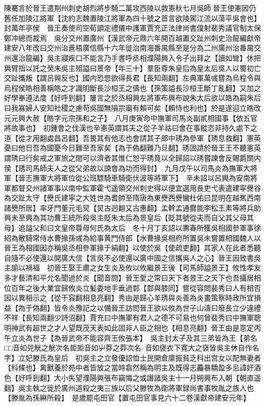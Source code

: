 陳騫言於晉王遣荆州刺史胡烈將步騎二萬攻西陵以救憲秋七月吳師晉王使憲因仍舊任加陵江將軍【沈約志魏置陵江將軍為四十號之首言欲陵駕江流以蕩平吳會也】封萬年亭侯　晉王奏使司空荀顗定禮儀中護軍賈充正法律尚書僕射裴秀議官制太保鄭冲總而裁焉　吳分交州置廣州【漢武帝元鼎六年開百越置交趾州刺史治龍編獻帝建安八年改曰交州治蒼梧廣信縣十六年徙治南海番禺縣至是分為二州廣州治番禺交州還治龍編】吳主寢疾口不能言乃手書呼丞相濮陽興入令子出拜之【讀如彎】休把興臂指以託之癸未吳主殂謚曰景帝【年三十】羣臣尊朱皇后為皇太后吳人以蜀初亡交趾攜叛【謂呂興反也】國内恐愳欲得長君【長知兩翻】左典軍萬彧嘗為烏程令與烏程侯皓相善稱皓之才識明斷長沙桓王之儔也【孫策謚長沙桓王斷丁亂翻】又加之好學奉遵法度【好呼到翻】屢言之於丞相興左將軍布興布說朱太后欲以皓為嗣朱后曰我寡婦人安知社稷之慮苟吳國無隕宗廟有賴可矣【賴恃也利也】於是遂迎立皓改元元興大赦【皓字元宗孫和之子】　八月庚寅命中撫軍司馬炎副貳相國事【依五官將故事也】　初鍾會之伐漢也辛憲英謂其夫之從子羊祜曰會在事縱恣非持久處下之道【從才用翻處昌呂翻】吾畏其有他志也會請其子郎中琇為參軍【琇息救翻】憲英憂曰他日吾為國憂今日難至吾家矣【為于偽翻難乃旦翻】琇固請於晉王王不聽憲英謂琇曰行矣戒之軍旅之間可以濟者其惟仁恕乎琇竟以全歸詔以琇嘗諫會反賜爵關内侯【琇司馬師夫人之從父弟故以諫會為功而得封】　九月戊午以司馬炎為撫軍大將軍【晉志撫軍大將軍位從公班驃騎車騎衛伏波等將軍下】　辛未詔以呂興為安南將軍都督交州諸軍事以南中監軍霍弋遥領交州刺史得以便宜選用長吏弋表遣建寜㸑谷為交趾太守【㸑氏建寜之大姓世為耆帥至隋唐為東㸑西㸑蠻杜佑曰昆明在越嶲西南諸㸑所居】率牙門董元毛炅【炅古迥翻又古惠翻】孟幹孟通爨能李松王素等將兵助興未至興為其功曹王統所殺吳主貶朱太后為景皇后【貶其號從夫而自父其父母其母】追謚父和曰文皇帝尊母何氏為太后　冬十月丁亥詔以夀春所獲吳相國參軍事徐紹為散騎常侍水曹掾孫彧為給事黄門侍郎【水曹掾吳相府所置吳未嘗置相國魏人以晉王為相國因亦稱吳丞相參軍掾于絹翻】以使於吳【使疏吏翻】其家人在此者悉聽自隨不必使還以開廣大信【言吳不必使還以廣中國之信攜吳人之心】晉王因致書吳主諭以禍福　初晉王娶王肅之女生炎及攸以攸繼景王後【司馬師謚景王】攸性孝友多才藝清和平允名聞過於炎【聞音問】晉王愛之常曰天下者景王之天下也吾攝居相位百年之後大業宜歸攸炎立髪委地手垂過䣛【䣛與膝同】嘗從容問裴秀曰人有相否因以異相示之【從干容翻相息亮翻】秀由是歸心羊琇與炎善為炎畫策察時政所宜損益【為于偽翻】皆令炎豫記之以備晉王訪問晉王欲以攸為世子山濤曰廢長立少違禮不祥【長知兩翻少詩沼翻】賈充曰中撫軍有君人之德不可易也何曾裴秀曰中撫軍聰明神武有超世之才人望既茂天表如此固非人臣之相也【相息亮翻】晉王由是意定丙午立炎為世子【為晉武帝不能容齊王攸張本】　吳主封太子及其三弟皆為王【弟名□□音如兕觥之觥次名壾壾音如屮莽之莽次名音如襃衣下寛大之褎皆吳主休自作名字】立妃滕氏為皇后　初吳主之立發優詔恤士民開倉廪振貧乏科出宫女以配無妻者【科條也】禽獸養於苑中者皆放之當時翕然稱為明主及既得志麤暴驕盈多忌諱好酒色【好呼到翻】大小失望濮陽興張布竊悔之或譖諸吳主十一月朔興布入朝【朝直遥翻】吳主執之徙於廣州道殺之夷三族以后父滕牧為衛將軍録尚書事牧胤之族人也【滕胤為孫綝所殺】　是歲罷屯田官【置屯田官事見六十二卷漢獻帝建安元年】

